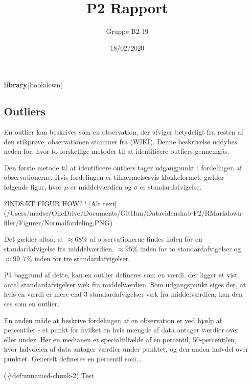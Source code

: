 \documentclass[]{article}
\title{P2 Rapport}
\author{Gruppe B2-19}
\date{18/02/2020}
\newenvironment{Shaded}{\begin{snugshade}}{\end{snugshade}}
\newcommand{\KeywordTok}[1]{\textcolor[rgb]{0.13,0.29,0.53}{\textbf{#1}}}
\newcommand{\NormalTok}[1]{#1}
\begin{document}
\maketitle

\begin{Shaded}
\begin{Highlighting}[]
\KeywordTok{library}\NormalTok{(bookdown)}
\end{Highlighting}
\end{Shaded}

\hypertarget{outliers}{%
\subsection{Outliers}\label{outliers}}

En outlier kan beskrives som en observation, der afviger betydeligt fra
resten af den stikprøve, observationen stammer fra (WIKI). Denne
beskrivelse uddybes neden for, hvor to forskellige metoder til at
identificere outliers gennemgås.

Den første metode til at identificere outliers tager udgangpunkt i
fordelingen af observationerne. Hvis fordelingen er tilnærmelsesvis
klokkeformet, gælder følgende figur, hvor \(\mu\) er middelværdien og
\(\sigma\) er standardafvigelse.

?INDSÆT FIGUR HOW? ! {[}Alt text{]}
(/Users/madsc/OneDrive/Documents/GitHun/Datavidenskab-P2/RMarkdown-filer/Figurer/Normalfordeling.PNG)

Det gælder altså, at \(\approx 68 \%\) af observationerne findes inden
for en standardafvigelse fra middelværdien, \(\approx 95 \%\) inden for
to standardafvigelser og \(\approx 99,7 \%\) inden for tre
standardafvigelser.

På baggrund af dette, kan en outlier defineres som en værdi, der ligger
et vist antal standardafvigelser væk fra middelværdien. Som udgangspunkt
siges det, at hvis en værdi er mere end \(3\) standardafvigelser væk fra
middelværdien, kan den ses som en outlier.

En anden måde at beskrive fordelingen af en observation er ved hjælp af
percentiler - et punkt for hvilket en hvis mængde af data antager
værdier over eller under. Her en medianen et specialtilfælde af en
percentil, 50-percentilen, hvor halvdelen af data antager værdier under
punktet, og den anden halvdel over punktet. Generelt defineres en
percentil som\ldots{}


\protect\hypertarget{def:unnamed-chunk-2}{}{(\#def:unnamed-chunk-2)
}Test
\end{document}
